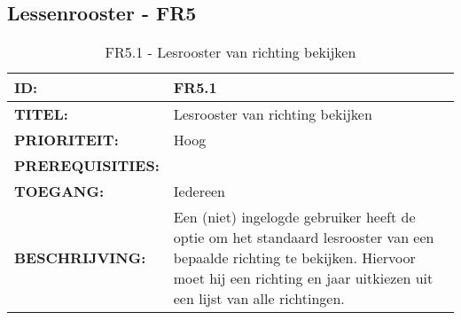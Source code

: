 \subsection{Lessenrooster - FR5}

\noindent\begin{table}[H]
            \begin{tabular}{l | p{10cm}}
                \textbf{ID:} & FR5.1 \\ \hline
                \textbf{TITEL:} & Lesrooster van richting bekijken \\ \hline
                \textbf{PRIORITEIT:} &  Hoog \\ \hline
                \textbf{PREREQUISITIES:} & \\ \hline
                \textbf{TOEGANG:} &  Iedereen \\ \hline
                \textbf{BESCHRIJVING:} & Een (niet) ingelogde gebruiker heeft de optie om het standaard lesrooster van een bepaalde richting te bekijken. Hiervoor moet hij een richting en jaar uitkiezen uit een lijst van alle richtingen.\\
            \end{tabular}\\
            \caption{FR5.1 - Lesrooster van richting bekijken}
            \label{tab:FR5.1 - Lesrooster van richting bekijken}
        \end{table}

